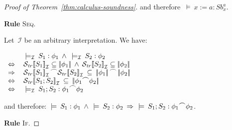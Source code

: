 \documentclass[10pt,a4paper]{amsart}
\theoremstyle{definition}
\newcommand{\denot}[1]{\left[\!\left[#1\right]\!\right]}
\newcommand{\fdenot}[1]{\left|\!\left|#1\right|\!\right|}
\newcommand{\trcdenoti}[1]{\mathcal{S}_{\mathit{tr}}\!\denot{#1}_{\mathcal{I}}}
\newcommand{\chop}[0]{\raisebox{1ex}{$\frown$}}
\newcommand{\judge}[2]{#1 : #2}
\newcommand{\semsequent}[2]{#1 \>\models\> #2}
\newcommand{\semsequenti}[2]{#1 \>\models_\mathcal{I}\> #2}
\begin{document}
\begin{proof}[Proof of Theorem~\ref{thm:calculus-soundness}]
  \noindent
  and therefore $\semsequent{}{\judge{x := a}{\mathit{Sb}^a_x}}$.

  \noindent\textbf{Rule} \textsc{Seq}.

  Let~$\mathcal{I}$ be an arbitrary interpretation.
  We have: %
  
  $
  \begin{array}{ll}
    & 
      \semsequenti{}{\judge{S_1}{\phi_1}} \>\>\wedge\>
      \semsequenti{}{\judge{S_2}{\phi_2}} \\
    \Leftrightarrow\> & 
                        \trcdenoti{S_1} \subseteq \fdenot{\phi_1} 
                        \>\wedge\>
                        \trcdenoti{S_2} \subseteq \fdenot{\phi_2} \\
    \Rightarrow & 
                  \trcdenoti{S_1} \chop \trcdenoti{S_2} \>\subseteq\>
                  \fdenot{\phi_1} \chop \fdenot{\phi_2} \\
    \Leftrightarrow & 
                      \trcdenoti{S_1 ; S_2} \>\subseteq\>
                      \fdenot{\phi_1 \chop \phi_2} \\
    \Leftrightarrow & 
                      \semsequenti{}{\judge{S_1; S_2}{\phi_1 \chop \phi_2}} 
  \end{array} $ %

  \noindent
  and therefore: 
  $ \semsequent{}{\judge{S_1}{\phi_1}} \>\>\wedge\,
  \semsequent{}{\judge{S_2}{\phi_2}}
  \>\Rightarrow\>\>
  \semsequent{}{\judge{S_1; S_2}{\phi_1 \chop \phi_2}} $.
  \fi

  \noindent\textbf{Rule} \textsc{If}.


\end{proof}
\end{document}
